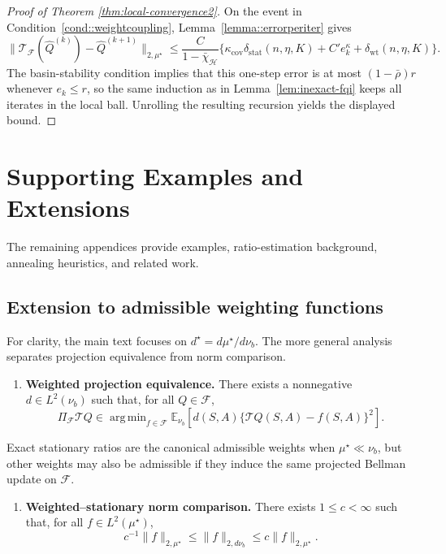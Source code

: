 \documentclass{article}
\DeclareMathOperator*{\argmin}{arg\,min}
\theoremstyle{plain}
\theoremstyle{definition}
\theoremstyle{remark}
\newcommand{\E}{\mathbb{E}}
\begin{document}
\begin{proof}[Proof of Theorem \ref{thm:local-convergence2}]
On the event in Condition~\ref{cond::weightcoupling}, Lemma~\ref{lemma::errorperiter}
gives
\[
\|\mathcal T_{\mathcal F}(\widehat Q^{(k)})-\widehat Q^{(k+1)}\|_{2,\mu^\star}
\le
\frac{C}{1-\bar\chi_{\mathcal H}}
\{\kappa_{\mathrm{cov}}\delta_{\mathrm{stat}}(n,\eta,K)
+C'e_k^\kappa+\delta_{\mathrm{wt}}(n,\eta,K)\}.
\]
The basin-stability condition implies that this one-step error is at most
\((1-\bar\rho)r\) whenever \(e_k\le r\), so the same induction as in
Lemma~\ref{lem:inexact-fqi} keeps all iterates in the local ball. Unrolling the
resulting recursion yields the displayed bound.
\end{proof}


\section{Supporting Examples and Extensions}
\label{app:supporting-examples-extensions}

The remaining appendices provide examples, ratio-estimation background, annealing heuristics, and related work.

\subsection{Extension to admissible weighting functions}
\label{sec:admissible}

For clarity, the main text focuses on \(d^\star=d\mu^\star/d\nu_b\). The more
general analysis separates projection equivalence from norm comparison.

\begin{enumerate}[label=\textbf{C\arabic*)}, ref={C\arabic*}, leftmargin=1.5em, resume=cond]
\item \label{cond::overlap}
\textbf{Weighted projection equivalence.}
There exists a nonnegative \(d\in L^2(\nu_b)\) such that, for all
\(Q\in\mathcal F\),
\[
\Pi_{\mathcal F}\mathcal TQ
\in
\argmin_{f\in\mathcal F}
\E_{\nu_b}\!\left[
d(S,A)\{\mathcal TQ(S,A)-f(S,A)\}^2
\right].
\]
\end{enumerate}

Exact stationary ratios are the canonical admissible weights when
\(\mu^\star\ll\nu_b\), but other weights may also be admissible if they induce
the same projected Bellman update on \(\mathcal F\).

\begin{enumerate}[label=\textbf{C\arabic*)}, ref={C\arabic*}, leftmargin=1.5em, resume=cond]
\item \label{cond::norm-compare}
\textbf{Weighted--stationary norm comparison.}
There exists \(1\le c<\infty\) such that, for all \(f\in L^2(\mu^\star)\),
\[
c^{-1}\|f\|_{2,\mu^\star}
\le
\|f\|_{2,d\nu_b}
\le
c\|f\|_{2,\mu^\star}.
\]
\end{enumerate}
\end{document}
